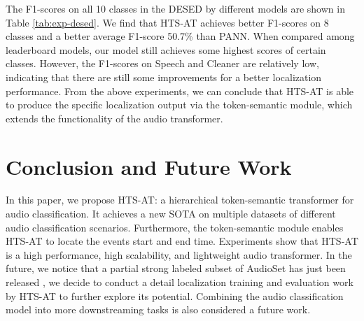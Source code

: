 \documentclass{article}
\begin{document}
The F1-scores on all 10 classes in the DESED by different models are shown in Table \ref{tab:exp-desed}. We find that HTS-AT achieves better F1-scores on 8 classes and a better average F1-score 50.7\% than PANN. When compared among leaderboard models, our model still achieves some highest scores of certain classes. However, the F1-scores on Speech and Cleaner are relatively low, indicating that there are still some improvements for a better localization performance. From the above experiments, we can conclude that HTS-AT is able to produce the specific localization output via the token-semantic module, which extends the functionality of the audio transformer. 

\vspace{-0.4cm}
\section{Conclusion and Future Work}
\vspace{-0.2cm}
In this paper, we propose HTS-AT: a hierarchical token-semantic transformer for audio classification. It achieves a new SOTA on multiple datasets of different audio classification scenarios. Furthermore, the token-semantic module enables HTS-AT to locate the events start and end time. Experiments show that HTS-AT is a high performance, high scalability, and lightweight audio transformer. In the future, we notice that a partial strong labeled subset of AudioSet has just been released \cite{audioset-strong}, we decide to conduct a detail localization training and evaluation work by HTS-AT to further explore its potential. Combining the audio classification model into more downstreaming tasks \cite{ke-sep, ke-cmg} is also considered a future work.



\end{document}
